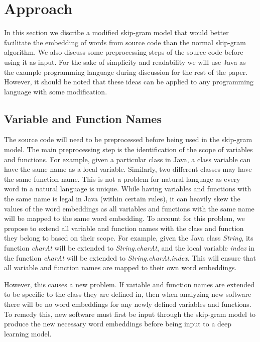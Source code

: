 \section{Approach}

In this section we discribe a modified skip-gram model that would better facilitate the embedding of words from source code than the normal skip-gram algorithm. We also discuss some preprocessing steps of the source code before using it as input. For the sake of simplicity and readability we will use Java as the example programming language during discussion for the rest of the paper. However, it should be noted that these ideas can be applied to any programming language with some modification.

\subsection{Variable and Function Names}

The source code will need to be preprocessed before being used in the skip-gram model. The main preprocessing step is the identification of the scope of variables and functions. For example, given a particular class in Java, a class variable can have the same name as a local variable. Similarly, two different classes may have the same function name. This is not a problem for natural language as every word in a natural language is unique. While having variables and functions with the same name is legal in Java (within certain rules), it can heavily skew the values of the word embeddings as all variables and functions with the same name will be mapped to the same word embedding. To account for this problem, we propose to extend all variable and function names with the class and function they belong to based on their scope. For example, given the Java class \textit{String}, its function \textit{charAt} will be extended to \textit{String.charAt}, and the local variable \textit{index} in the function \textit{charAt} will be extended to \textit{String.charAt.index}. This will ensure that all variable and function names are mapped to their own word embeddings.

However, this causes a new problem. If variable and function names are extended to be specific to the class they are defined in, then when analyzing new software there will be no word embeddings for any newly defined variables and functions. To remedy this, new software must first be input through the skip-gram model to produce the new necessary word embeddings before being input to a deep learning model.

